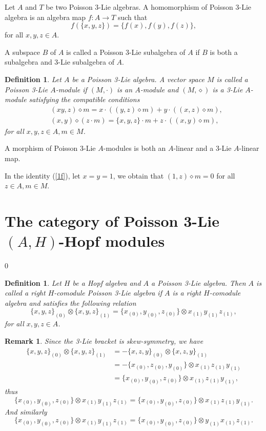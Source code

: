 \documentclass[11pt]{article}
\newtheorem{definition}[theorem]{Definition}
\newtheorem{remark}[theorem]{Remark}
\def\di{\diamond}
\def\ot{\otimes}
\begin{document}
Let $A$ and $T$ be two Poisson 3-Lie algebras. A homomorphism of Poisson 3-Lie algebra is an algebra map $f:A\rightarrow T$ such that
$$f(\{x,y,z\})=\{f(x),f(y),f(z)\},$$
for all $x,y,z\in A$.

A subspace $B$ of $A$ is called a Poisson 3-Lie subalgebra of $A$ if $B$ is both a subalgebra and 3-Lie subalgebra of $A$.

\begin{definition}
Let $A$ be a Poisson 3-Lie algebra. A vector space $M$ is called a Poisson 3-Lie $A$-module if $(M,\cdot)$ is an $A$-module and $(M,\di)$ is a 3-Lie $A$-module satisfying the compatible conditions
\begin{align}
&(xy,z)\di m=x\cdot((y,z)\di m)+y\cdot((x,z)\di m),\label{1f}\\
&(x,y)\di(z\cdot m)=\{x,y,z\}\cdot m+z\cdot((x,y)\di m),\label{1g}
\end{align}
for all $x,y,z\in A,m\in M$.
\end{definition}
A morphism of Poisson 3-Lie $A$-modules is both an $A$-linear and a 3-Lie $A$-linear map.

In the identity (\ref{1f}), let $x=y=1$, we obtain that $(1,z)\di m=0$ for all $z\in A,m\in M$.


\section{The category of Poisson 3-Lie $(A,H)$-Hopf modules}
\def\theequation{2.\arabic{equation}}
\setcounter{equation} {0}

\begin{definition}
Let $H$ be a Hopf algebra and $A$ a Poisson 3-Lie algebra. Then $A$ is called a right $H$-comodule Poisson 3-Lie algebra if $A$ is a right $H$-comodule algebra and satisfies the following relation
\begin{equation}
\{x,y,z\}_{(0)}\ot\{x,y,z\}_{(1)}=\{x_{(0)},y_{(0)},z_{(0)}\}\ot x_{(1)}y_{(1)}z_{(1)},\label{2a}
\end{equation}
for all $x,y,z\in A$.
\end{definition}

\begin{remark}
Since the 3-Lie bracket is skew-symmetry, we have
\begin{align*}
\{x,y,z\}_{(0)}\ot\{x,y,z\}_{(1)}&=-\{x,z,y\}_{(0)}\ot\{x,z,y\}_{(1)}\\
&=-\{x_{(0)},z_{(0)},y_{(0)}\}\ot x_{(1)}z_{(1)}y_{(1)}\\
&=\{x_{(0)},y_{(0)},z_{(0)}\}\ot x_{(1)}z_{(1)}y_{(1)},
\end{align*}
thus
$$\{x_{(0)},y_{(0)},z_{(0)}\}\ot x_{(1)}y_{(1)}z_{(1)}=\{x_{(0)},y_{(0)},z_{(0)}\}\ot x_{(1)}z_{(1)}y_{(1)}.$$
And similarly
$$\{x_{(0)},y_{(0)},z_{(0)}\}\ot x_{(1)}y_{(1)}z_{(1)}=\{x_{(0)},y_{(0)},z_{(0)}\}\ot y_{(1)}x_{(1)}z_{(1)}.$$
\end{remark}
\end{document}
